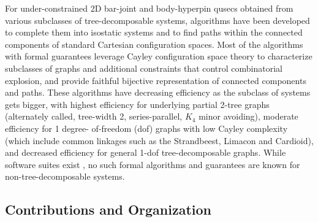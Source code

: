 \medskip\noindent
{}
For under-constrained 2D bar-joint and body-hyperpin qusecs obtained
from various subclasses of tree-decomposable systems, algorithms have
been developed to complete them into isostatic systems
\cite{joan-arinyo2003transforming,sitharam2005combinatorial,gao2006ctree,sitharam2010convex} and to find paths within the connected components
\cite{sitharam2011cayleyI,hidalgo2011reachability} of standard Cartesian configuration spaces. 
Most of the
algorithms with formal guarantees leverage Cayley configuration space
theory \cite{sitharam2010convex,sitharam2011cayleyI,sitharam2011cayleyII} to characterize subclasses of graphs and
additional constraints that control combinatorial explosion, and
provide faithful bijective representation of connected components and
paths. These algorithms have decreasing efficiency as the subclass of
systems gets bigger, with highest efficiency for underlying partial
2-tree graphs (alternately called, tree-width 2, series-parallel, $K_4$
minor avoiding), moderate efficiency for 1 degree- of-freedom (dof)
graphs with low Cayley complexity (which include common linkages such
as the Strandbeest, Limacon and Cardioid), and decreased efficiency
for general 1-dof tree-decomposable graphs. While software suites
exist  \cite{keycurriculum1995geometer,porta2014open,siemens1999d,todd2007geometry}, no such formal algorithms and guarantees are known
for non-tree-decomposable systems.
%
\subsection{Contributions and Organization}
\label{sec:cont}

